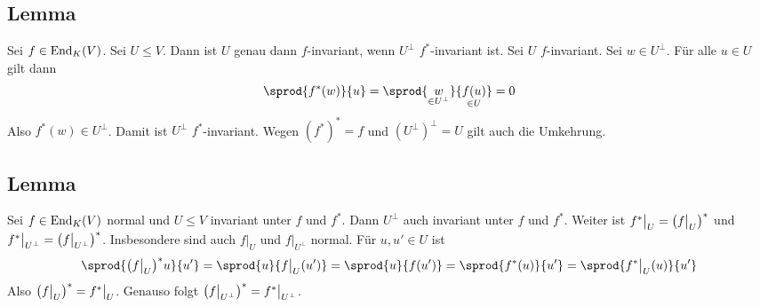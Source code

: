 \subsection[Lemma über $f$-Invarianz eines Unterraums und seines orthogonalen Komplements]{Lemma} %
\label{sub:135}
Sei $f \in \End_K(V)$. Sei $U \le V$. Dann ist $U$ genau dann $f$-invariant, wenn $U^\bot $ $f^*$-invariant ist.
Sei $U$ $f$-invariant. Sei $w \in U^\bot$. Für alle $u \in U$ gilt dann
\[
	\sprod{f^* (w)}{u}  = \sprod{\underset{\in U^\bot}{w}}{\underset{\in U}{f(u)}} = 0
\]
Also $f^*(w) \in U^\bot$. Damit ist $U^\bot$ $f^*$-invariant. Wegen $(f^*)^*=f$ und $(U^\bot)^\bot=U$ gilt auch die Umkehrung. \bewende

\subsection[Lemma über einen Unterraum, der sowohl $f$- als auch $f^*$-invariant ist]{Lemma} %
\label{sub:136}
Sei $f \in\End_K(V)$ normal und $U\le V$ invariant unter $f$ und $f^*$. Dann $U^\bot$ auch invariant unter $f$ und $f^*$. Weiter ist 
$f^* \big|_U = \enbrace*{f \big|_U}^*$ 
und $f^* \big|_{U^\bot} = \enbrace*{f\big|_{U^\bot}}^* $. Insbesondere sind auch $f|_U$ und $f|_{U^\bot}$ normal.
Für $u,u' \in U$ ist
\[
	\sprod{\enbrace*{f\big|_U}^* u }{u'} = \sprod{u}{f\big|_U (u')} = \sprod{u}{f(u')} = \sprod{f^* (u)}{u'} = \sprod{f^*\big|_U (u)}{u'}     
\]
Also $\enbrace*{f\big|_U}^* = f^*\big|_U $. Genauso folgt $\enbrace*{f\big|_{U^\bot}}^* = f^* \big|_{U^\bot} $. \bewende


